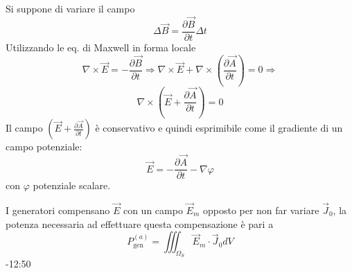 Si suppone di variare il campo
$$
\Delta\vec{B} = \frac{\partial \vec{B}}{\partial t} \Delta t
$$
Utilizzando le eq. di Maxwell in forma locale
$$
\nabla\times\vec{E} = -\frac{\partial \vec{B}}{\partial t} \Rightarrow \nabla\times\vec{E} 
+ \nabla \times \left(\frac{\partial \vec{A}}{\partial t}\right) = 0 \Rightarrow 
$$
$$
\nabla\times\left(\vec{E}+\frac{\partial\vec{A}}{\partial t}\right) = 0
$$
Il campo $\left(\vec{E} + \frac{\partial \vec{A}}{\partial t}\right)$ è conservativo e 
quindi esprimibile come il gradiente di un campo potenziale:
$$
\vec{E} = -\frac{\partial \vec{A}}{\partial t} - \nabla\varphi
$$
con $\varphi$ potenziale scalare.

I generatori compensano $\vec{E}$ con un campo $\vec{E}_m$ opposto per non far
variare $\vec{J}_0$, la potenza necessaria ad effettuare questa compensazione è pari
a 
$$
P^{(a)}_{\text{gen}} = \iiint_{\Omega_S} \vec{E}_m\cdot\vec{J}_0 dV
$$
-12:50
